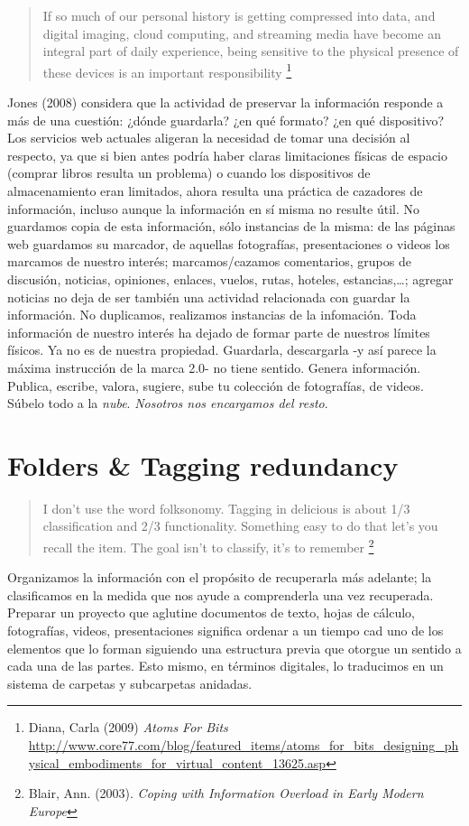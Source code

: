 \documentclass[12pt, a4paper,twoside]{book}
\newcommand{\chap}[1]{\newpage\thispagestyle{empty}\chapter{#1}\label{chap:\thechapter}}
\begin{document}
\begin{quote}
If so much of our personal history is getting compressed into data,
and digital imaging, cloud computing, and streaming media have
become an integral part of daily experience, being sensitive to the
physical presence of these devices is an important responsibility%
\footnote{Diana, Carla (2009) \emph{Atoms For Bits}
\href{http://www.core77.com/blog/featured_items/atoms_for_bits_designing_physical_embodiments_for_virtual_content_13625.asp}{http://www.core77.com/blog/featured\_items/atoms\_for\_bits\_designing\_physical\_embodiments\_for\_virtual\_content\_13625.asp}}

\end{quote}
Jones (2008) considera que la actividad de preservar la información
responde a más de una cuestión: ¿dónde guardarla? ¿en qué formato?
¿en qué dispositivo? Los servicios web actuales aligeran la
necesidad de tomar una decisión al respecto, ya que si bien antes
podría haber claras limitaciones físicas de espacio (comprar libros
resulta un problema) o cuando los dispositivos de almacenamiento
eran limitados, ahora resulta una práctica de cazadores de
información, incluso aunque la información en sí misma no resulte
útil. No guardamos copia de esta información, sólo instancias de la
misma: de las páginas web guardamos su marcador, de aquellas
fotografías, presentaciones o videos los marcamos de nuestro
interés; marcamos/cazamos comentarios, grupos de discusión,
noticias, opiniones, enlaces, vuelos, rutas, hoteles,
estancias,\ldots{}; agregar noticias no deja de ser también una
actividad relacionada con guardar la información. No duplicamos,
realizamos instancias de la infomación. Toda información de nuestro
interés ha dejado de formar parte de nuestros límites físicos. Ya
no es de nuestra propiedad. Guardarla, descargarla -y así parece la
máxima instrucción de la marca 2.0- no tiene sentido. Genera
información. Publica, escribe, valora, sugiere, sube tu colección
de fotografías, de videos. Súbelo todo a la \emph{nube}.
\emph{Nosotros nos encargamos del resto}.

\chap{Folders \& Tagging redundancy}

\begin{quote}
I don't use the word folksonomy. Tagging in delicious is about 1/3
classification and 2/3 functionality. Something easy to do that
let's you recall the item. The goal isn't to classify, it's to
remember%
\footnote{Blair, Ann. (2003).
\emph{Coping with Information Overload in Early Modern Europe}}

\end{quote}
Organizamos la información con el propósito de recuperarla más
adelante; la clasificamos en la medida que nos ayude a comprenderla
una vez recuperada. Preparar un proyecto que aglutine documentos de
texto, hojas de cálculo, fotografías, videos, presentaciones
significa ordenar a un tiempo cad uno de los elementos que lo
forman siguiendo una estructura previa que otorgue un sentido a
cada una de las partes. Esto mismo, en términos digitales, lo
traducimos en un sistema de carpetas y subcarpetas anidadas.
\end{document}
